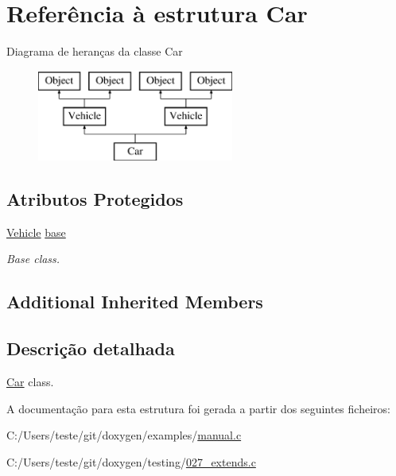\hypertarget{struct_car}{\section{Referência à estrutura Car}
\label{struct_car}
}
Diagrama de heranças da classe Car\begin{figure}[H]
\begin{center}
\leavevmode
\includegraphics[height=3.000000cm]{struct_car}
\end{center}
\end{figure}
\subsection*{Atributos Protegidos}
\begin{DoxyCompactItemize}
\item 
\hypertarget{struct_car_aea78492ff0e6add272aedd448bf00b6c}{\hyperlink{struct_vehicle}{Vehicle} \hyperlink{struct_car_aea78492ff0e6add272aedd448bf00b6c}{base}}\label{struct_car_aea78492ff0e6add272aedd448bf00b6c}

\begin{DoxyCompactList}\small\item\em Base class. \end{DoxyCompactList}\end{DoxyCompactItemize}
\subsection*{Additional Inherited Members}


\subsection{Descrição detalhada}
\hyperlink{struct_car}{Car} class. 

A documentação para esta estrutura foi gerada a partir dos seguintes ficheiros\-:\begin{DoxyCompactItemize}
\item 
C\-:/\-Users/teste/git/doxygen/examples/\hyperlink{manual_8c}{manual.\-c}\item 
C\-:/\-Users/teste/git/doxygen/testing/\hyperlink{027__extends_8c}{027\-\_\-extends.\-c}\end{DoxyCompactItemize}
